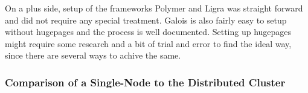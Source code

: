 On a plus side, setup of the frameworks Polymer and Ligra was straight forward and did not require any special treatment.
Galois is also fairly easy to setup without hugepages and the process is well documented. 
Setting up hugepages might require some research and a bit of trial and error to find the ideal way, since there are several ways to achive the same.











\subsubsection{Comparison of a Single-Node to the Distributed Cluster}
